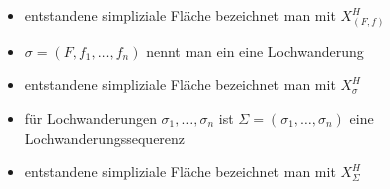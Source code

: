 \documentclass{beamer}
\begin{document}
\begin{frame}
\begin{figure}[H]
\end{figure}
 \end{frame}
 
 


 \begin{frame}
 \begin{itemize}
 \item entstandene simpliziale Fläche bezeichnet man mit $X^H_{(F,f)}$ \pause
 \item $\sigma =(F,f_1,\ldots,f_n)$ nennt man ein eine Lochwanderung \pause
 \item entstandene simpliziale Fläche bezeichnet man mit  $X^H_{\sigma}$ \pause
 \item für Lochwanderungen $\sigma_1,\ldots, \sigma_n$ ist $\Sigma =(\sigma_1, \ldots, \sigma_n)$ eine Lochwanderungssequerenz \pause
 \item entstandene simpliziale Fläche bezeichnet man mit $X^H_{\Sigma}$
 \end{itemize}
 
\end{frame}
\end{document}
